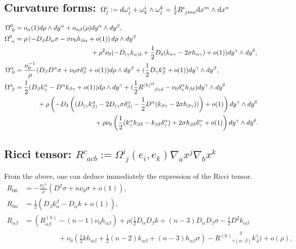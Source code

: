 \documentclass[a4paper, 10pt]{article}
\theoremstyle{remark}
\begin{document}
 \subsection*{Curvature forms: $\Omega^i_j := d\omega^i_j + \omega^i_k\wedge \omega^k_j=\frac{1}{2}R^i_{\,\,jmn}\textnormal{d}x^m\wedge \textnormal{d}x^n$ }
\begin{align}
\Omega^0_{\,\,0} &= o_\alpha(1)d\rho\wedge dy^\alpha + o_{\alpha \beta}(\rho) dy^\alpha\wedge d y^\beta,\\
\Omega^0_{\,\,\alpha}&=\rho\left(-D_\beta D_\alpha \sigma -\sigma\nu_0h_{\beta\alpha} +o(1) \right)d\rho \wedge dy^\beta\\&\hspace{4cm}+\rho^2\nu_0(-D_{(\gamma}k_{\alpha)\delta}+\frac{1}{2}D_\delta(k_{\alpha \gamma} -2\sigma h_{\alpha\gamma})+o(1))dy^\gamma \wedge dy ^\delta, 
\\
\Omega^\alpha_{\,\, 0} &= \frac{\nu_0^{-1}}{\rho}(D_\beta D^\alpha \sigma + \nu_0\sigma \delta^\alpha_\beta + o(1))d\rho \wedge dy^\beta+(\frac{1}{2}D_\gamma k^\alpha_\beta +o(1))dy^\gamma\wedge dy^\beta,
\\
\Omega^\alpha_{\,\,\beta}&=\frac{1}{2}(D_\beta k^\alpha_\gamma-D^\alpha k_{\beta \gamma} +o(1))d\rho\wedge dy^\gamma +(\frac{1}{2}{R^{(h)}}^{\alpha}_{\phantom{\alpha}\beta\gamma\delta}-\nu_0\delta^\alpha_\gamma h_{\beta\delta} )dy^\gamma\wedge dy^\delta\\&\hspace{1.2cm}+\rho\left(-D_{\delta}\left((D_{(\gamma}k^\alpha_{\beta)} -2D_{(\gamma}\sigma\delta^\alpha_{\beta)}-\frac{1}{2}D^\alpha(k_{\beta\gamma}-2\sigma h_{\beta\gamma})) \right) +o(1)\right)dy^\gamma\wedge dy^\delta
\\&\hspace{4.2cm}+\rho\nu_0 \left(\frac{1}{2}(k^\alpha_\gamma h_{\beta\delta} -k_{\beta\delta}\delta^\alpha_\gamma)+2\sigma h_{\beta\delta}\delta^{\alpha}_{\gamma} +o(1)\right)dy^\gamma\wedge dy^\delta.
\end{align}
%
\subsection*{Ricci tensor: $R^c_{\phantom{c}acb}:= \Omega^i_{\,\,j}(e_i,e_k)\nabla_ ax^j \nabla_bx^k$}
From the above, one can deduce immediately the expression of the Ricci tensor.
\begin{align} R_{00}&=-\frac{\nu_0^{-1}}{\rho}(D^2\sigma +n\nu_0\sigma +o(1)), \\
R_{0\alpha}&=\frac{1}{2}(D_\beta k^\beta_\alpha-D_\alpha k +o(1)), \\
R_{\alpha \beta}&= (R^{(h)}_{\alpha \beta}-(n-1)\nu_0h_{\alpha \beta}) + \rho(\frac{1}{2}D_\alpha D_\beta k +(n-3)D_\alpha D_\beta\sigma - \frac{1}{2}D^2k_{\alpha\beta}\\&\hspace{2cm}+\nu_0(\frac{1}{2}k h_{\alpha\beta}+\frac{1}{2}(n-2)k_{\alpha \beta} +(n-3)h_{\alpha\beta}\sigma ) - {R^{(h)}}_{\gamma(\alpha\phantom{\delta}\beta)}^{\phantom{\gamma(\alpha}\delta}k^\gamma_{\,\delta}) +o(\rho),
\end{align}
%




\newpage


\end{document}
